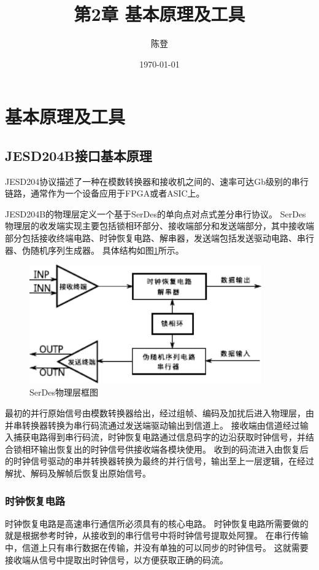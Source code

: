 \documentclass[UTF8]{ctexart}
\title{第2章 基本原理及工具}
\author{陈登}
\date{\today}
\begin{document}
\section{基本原理及工具}

\subsection{JESD204B接口基本原理}

JESD204协议描述了一种在模数转换器和接收机之间的、速率可达Gb级别的串行链路，通常作为一个设备应用于FPGA或者ASIC上。

JESD204B的物理层定义一个基于SerDes的单向点对点式差分串行协议。
SerDes物理层的收发端实现主要包括锁相环部分、接收端部分和发送端部分，其中接收端部分包括接收终端电路、时钟恢复电路、解串器，发送端包括发送驱动电路、串行器、伪随机序列生成器\cite{nishi2008asic}。
具体结构如图\ref{fig:serdes_phylayer_summery}所示。

\begin{figure}[H]
\centering
\includegraphics[width=10cm]{./img/serdes_phylayer_summery.pdf}
\caption{SerDes物理层框图}
\label{fig:serdes_phylayer_summery}
\end{figure}

最初的并行原始信号由模数转换器给出，经过组帧、编码及加扰后进入物理层，由并串转换器转换为串行码流通过发送端驱动输出到信道上。
接收端由信道经过输入捕获电路得到串行码流，时钟恢复电路通过信息码字的边沿获取时钟信号，并结合锁相环输出恢复出的时钟信号供接收端各模块使用。
收到的码流进入由恢复后的时钟信号驱动的串并转换器转换为最终的并行信号，输出至上一层逻辑，在经过解扰、解码及解帧后恢复出原始信号。

\subsubsection{时钟恢复电路}

时钟恢复电路是高速串行通信所必须具有的核心电路。
时钟恢复电路所需要做的就是根据参考时钟，从接收到的串行信号中将时钟信号提取处阿狸。
在串行传输中，信道上只有串行数据在传输，并没有单独的可以同步的时钟信号。
这就需要接收端从信号中提取出时钟信号，以方便获取正确的码流。
\end{document}
